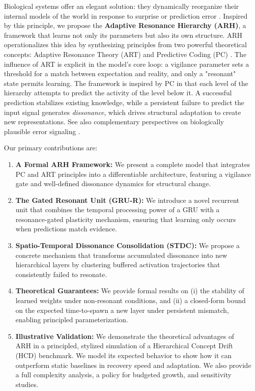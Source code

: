 \documentclass{article}
\numberwithin{figure}{section}
\numberwithin{table}{section}
\numberwithin{algorithm}{section}
\begin{document}
Biological systems offer an elegant solution: they dynamically reorganize their internal models of the world in response to surprise or prediction error \citep{Piaget1954}. Inspired by this principle, we propose the \textbf{Adaptive Resonance Hierarchy (ARH)}, a framework that learns not only its parameters but also its own structure. ARH operationalizes this idea by synthesizing principles from two powerful theoretical concepts: Adaptive Resonance Theory (ART) \citep{Grossberg1987} and Predictive Coding (PC) \citep{Rao1999,Friston2010}. The influence of ART is explicit in the model's core loop: a vigilance parameter sets a threshold for a match between expectation and reality, and only a "resonant" state permits learning. The framework is inspired by PC in that each level of the hierarchy attempts to predict the activity of the level below it. A successful prediction stabilizes existing knowledge, while a persistent failure to predict the input signal generates \emph{dissonance}, which drives structural adaptation to create new representations. See also complementary perspectives on biologically plausible error signaling \citep{Whittington2019}.

Our primary contributions are:
\begin{enumerate}
    \item \textbf{A Formal ARH Framework:} We present a complete model that integrates PC and ART principles into a differentiable architecture, featuring a vigilance gate and well-defined dissonance dynamics for structural change.
    \item \textbf{The Gated Resonant Unit (GRU-R):} We introduce a novel recurrent unit that combines the temporal processing power of a GRU \citep{Cho2014} with a resonance-gated plasticity mechanism, ensuring that learning only occurs when predictions match evidence.
    \item \textbf{Spatio-Temporal Dissonance Consolidation (STDC):} We propose a concrete mechanism that transforms accumulated dissonance into new hierarchical layers by clustering buffered activation trajectories that consistently failed to resonate.
    \item \textbf{Theoretical Guarantees:} We provide formal results on (i) the stability of learned weights under non-resonant conditions, and (ii) a closed-form bound on the expected time-to-spawn a new layer under persistent mismatch, enabling principled parameterization.
    \item \textbf{Illustrative Validation:} We demonstrate the theoretical advantages of ARH in a principled, stylized simulation of a Hierarchical Concept Drift (HCD) benchmark. We model its expected behavior to show how it can outperform static baselines in recovery speed and adaptation. We also provide a full complexity analysis, a policy for budgeted growth, and sensitivity studies.
\end{enumerate}
\end{document}
